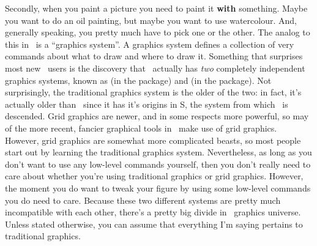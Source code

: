 Secondly, when you paint a picture you need to paint it {\bf with} something. Maybe you want to do an oil painting, but maybe you want to use watercolour. And, generally speaking, you pretty much have to pick one or the other. The analog to this in \R\ is a ``graphics system''. A graphics system defines a collection of very   commands about what to draw and where to draw it. Something that surprises most new \R\ users is the discovery that \R\ actually has {\it two} completely independent graphics systems, known as  (in the  package) and  (in the  package). Not surprisingly, the traditional graphics system is the older of the two: in fact, it's actually older than \R\ since it has it's origins in S, the system from which \R\ is descended. Grid graphics are newer, and in some respects more powerful, so may of the more recent, fancier graphical tools in \R\ make use of grid graphics. However, grid graphics are somewhat more complicated beasts, so most people start out by learning the traditional graphics system. Nevertheless, as long as you don't want to use any low-level commands yourself, then you don't really need to care about whether you're using traditional graphics or grid graphics. However, the moment you do want to tweak your figure by using some low-level commands you do need to care. Because these two different systems are pretty much incompatible with each other, there's a pretty big divide in \R\ graphics universe. Unless stated otherwise, you can assume that everything I'm saying pertains to traditional graphics. 

